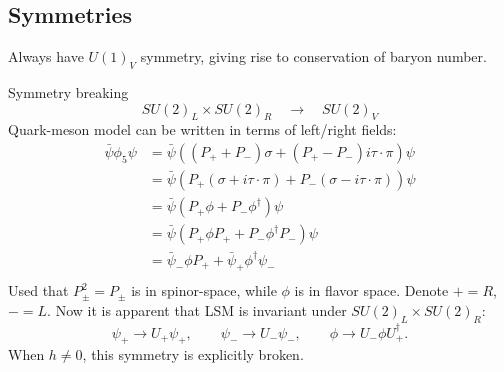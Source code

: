 \subsection{Symmetries}

Always have $U(1)_V$ symmetry, giving rise to conservation of baryon number.

Symmetry breaking
\begin{equation}
	SU(2)_L \times SU(2)_R \quad \rightarrow \quad SU(2)_V
\end{equation}
Quark-meson model can be written in terms of left/right fields:
\begin{equation}
\begin{split}
	\bar{\psi} \phi_5 \psi &= \bar{\psi} ( (P_+ + P_-) \sigma + (P_+ - P_-) i \tau \cdot \pi) \psi \\
	                       &= \bar{\psi} ( P_+ (\sigma + i \tau \cdot \pi) + P_- (\sigma - i \tau \cdot \pi) ) \psi \\
	                       &= \bar{\psi} ( P_+ \phi + P_- \phi^\dagger) \psi \\
	                       &= \bar{\psi} ( P_+ \phi P_+ + P_- \phi^\dagger P_-) \psi \\
	                       &= \bar{\psi}_- \phi P_+ + \bar{\psi}_+ \phi^\dagger \psi_- \\
\end{split}
\end{equation}
Used that $P_\pm^2 = P_\pm$ is in spinor-space, while $\phi$ is in flavor space.
Denote $+ = R$, $- = L$.
Now it is apparent that LSM is invariant under $SU(2)_L \times SU(2)_R$:
\begin{equation}
	\psi_+ \rightarrow U_+ \psi_+, \qquad
	\psi_- \rightarrow U_- \psi_-, \qquad
	\phi   \rightarrow U_- \phi U_+^\dagger.
\end{equation}
When $h \neq 0$, this symmetry is explicitly broken.



